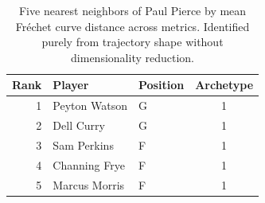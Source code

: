 \begin{table}[htbp]
  \centering\small
  \begin{tabular}{rllc}
    \toprule
    Rank & Player & Position & Archetype \\
    \midrule
    1 & Peyton Watson & G & 1 \\
    2 & Dell Curry & G & 1 \\
    3 & Sam Perkins & F & 1 \\
    4 & Channing Frye & F & 1 \\
    5 & Marcus Morris & F & 1 \\
    \bottomrule
  \end{tabular}
  \caption{Five nearest neighbors of Paul Pierce by mean Fr\'{e}chet curve distance across metrics. Identified purely from trajectory shape without dimensionality reduction.}
  \label{tab:Paul_Pierce_frechet_curve_neighbors}
\end{table}

